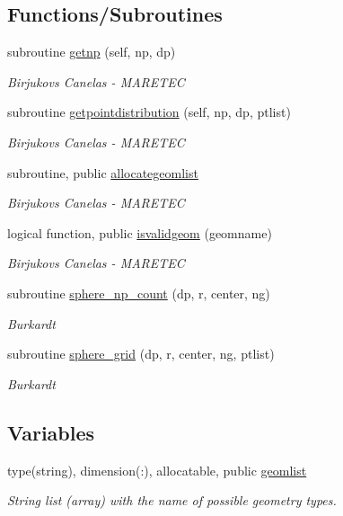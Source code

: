 \subsection*{Functions/\+Subroutines}
\begin{DoxyCompactItemize}
\item 
subroutine \mbox{\hyperlink{namespacegeometry_ad14d7800ac13b9a6722ac96b06ce94c9}{getnp}} (self, np, dp)
\begin{DoxyCompactList}\small\item\em Birjukovs Canelas -\/ M\+A\+R\+E\+T\+EC \end{DoxyCompactList}\item 
subroutine \mbox{\hyperlink{namespacegeometry_a726dae6e63f052138bd3346de439fbc4}{getpointdistribution}} (self, np, dp, ptlist)
\begin{DoxyCompactList}\small\item\em Birjukovs Canelas -\/ M\+A\+R\+E\+T\+EC \end{DoxyCompactList}\item 
subroutine, public \mbox{\hyperlink{namespacegeometry_a17652db20fde3f883b4fc778e0e6cdda}{allocategeomlist}}
\begin{DoxyCompactList}\small\item\em Birjukovs Canelas -\/ M\+A\+R\+E\+T\+EC \end{DoxyCompactList}\item 
logical function, public \mbox{\hyperlink{namespacegeometry_a56488a00edf7ba4e670ceffd5c36f13f}{isvalidgeom}} (geomname)
\begin{DoxyCompactList}\small\item\em Birjukovs Canelas -\/ M\+A\+R\+E\+T\+EC \end{DoxyCompactList}\item 
subroutine \mbox{\hyperlink{namespacegeometry_afb10fc3d303c98de110234acf3615274}{sphere\+\_\+np\+\_\+count}} (dp, r, center, ng)
\begin{DoxyCompactList}\small\item\em Burkardt \end{DoxyCompactList}\item 
subroutine \mbox{\hyperlink{namespacegeometry_ae1ab88f5bfa764765180e1ba417e4bdf}{sphere\+\_\+grid}} (dp, r, center, ng, ptlist)
\begin{DoxyCompactList}\small\item\em Burkardt \end{DoxyCompactList}\end{DoxyCompactItemize}
\subsection*{Variables}
\begin{DoxyCompactItemize}
\item 
type(string), dimension(\+:), allocatable, public \mbox{\hyperlink{namespacegeometry_a879bd9ccab6fc42f051bbfc9f0560a62}{geomlist}}
\begin{DoxyCompactList}\small\item\em String list (array) with the name of possible geometry types. \end{DoxyCompactList}\end{DoxyCompactItemize}


